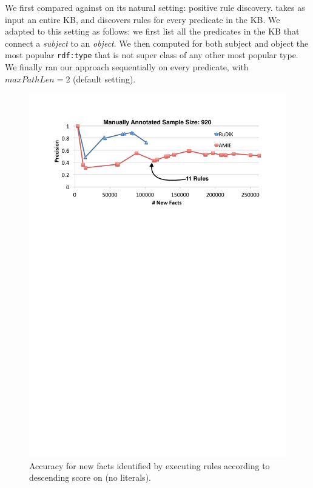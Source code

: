  We first compared against \amie on its natural setting: positive rule discovery. \amie takes as input an entire KB, and discovers rules for every predicate in the KB. We adapted \krd to this setting as follows: we first list all the predicates in the KB that connect a \emph{subject} to an \emph{object}. We then computed %
for both subject and object %
the most popular \texttt{rdf:type} that is not super class of any other most popular type. We finally ran our approach sequentially on every predicate, with $maxPathLen=2$ (\amie default setting).


\begin{figure}[htb]
	\centering
	\vspace{1ex}
	\includegraphics[width=.9\columnwidth]{include/figure/vsAmieYago.pdf}
	\vspace{-2ex}
	\caption{Accuracy for new facts identified by executing rules according to descending score on   (no literals).}
	\label{fig:vs_amie_yago}
\end{figure}



